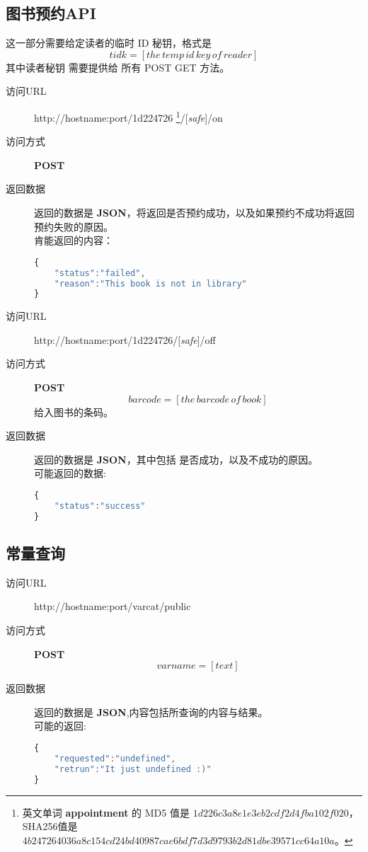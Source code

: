 \documentclass[UTF8]{article}
\def\safe{/[\textit{safe}]}
\def\POST{\colorbox[rgb]{0.77,0.53,0.97}{\textbf{POST}}}
\def\bfJSON{\textbf{JSON}\space}
\def\viaurl{\item[{\quad\colorbox[rgb]{0.47,0.88,0.89}{访问URL}}]}
\def\viareq#1{\item[{\quad\colorbox[rgb]{0.57,0.88,0.99}{访问方式}}] #1}
\def\rtdata{\item[{\quad\colorbox[rgb]{0.70,0.9,0.59}{返回数据}}]}
\begin{document}
        \subsection{图书预约API}
        这一部分需要给定读者的临时 ID 秘钥，格式是
        $$tidk=[the\,temp\,id\,key\,of\,reader]$$
        其中读者秘钥 需要提供给 所有 POST GET 方法。
        \begin{description}
	         \viaurl http://hostname:port/1d224726
	         \footnote{
	         	英文单词 \textbf{appointment} 的
	         	MD5 值是 $1d226c3a8e1e3eb2cdf2d4fba102f020$，
	         	SHA256值是 $4b247264036a8c154cd24bd40987cae6bdf7d3d9793b2d81dbe39571cc64a10a$。
	         }\safe/on
		     \viareq{\POST}
		     \rtdata 返回的数据是 \bfJSON ，将返回是否预约成功，以及如果预约不成功将返回预约失败的原因。
		     \\ 肯能返回的内容：
			 \begin{lstlisting}[language=JavaScript]
{
	"status":"failed",
	"reason":"This book is not in library"
}
			 \end{lstlisting}
	       \end{description}
        \begin{description}
	        \viaurl http://hostname:port/1d224726\safe/off
	        \viareq{\POST}
            $$barcode=[the\, barcode\,of\,book]$$
            给入图书的条码。
	        \rtdata 返回的数据是 \bfJSON ，其中包括 是否成功，以及不成功的原因。
            \\ 可能返回的数据:
            \begin{lstlisting}[language=JavaScript]
{
    "status":"success"
}
            \end{lstlisting}
	         \end{description}
        \subsection{常量查询}
        \begin{description}
	        \viaurl http://hostname:port/varcat/public
	        \viareq{\POST}
	        $$varname=[text]$$
	        \rtdata 返回的数据是 \bfJSON ,内容包括所查询的内容与结果。
	        \\ 可能的返回:
			\begin{lstlisting}[language=JavaScript]
{
	"requested":"undefined",
	"retrun":"It just undefined :)"
}
			\end{lstlisting}
			 \end{description}
\end{document}
